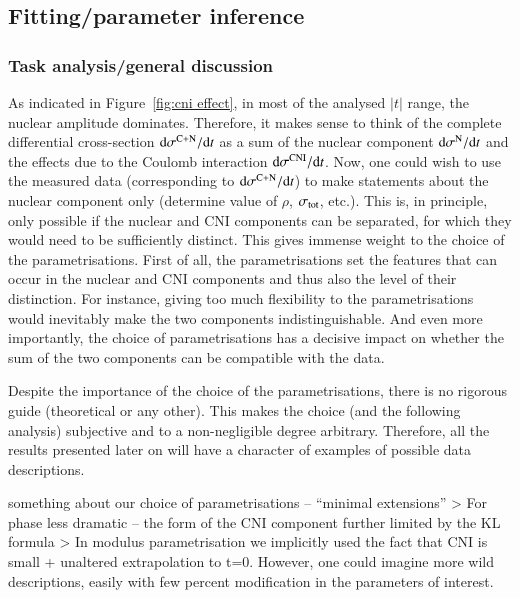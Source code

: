 \subsection{Fitting/parameter inference}
\label{sec:cni fitting}

\subsubsection{Task analysis/general discussion}

As indicated in Figure~\ref{fig:cni effect}, in most of the analysed $|t|$ range, the nuclear amplitude dominates. Therefore, it makes sense to think of the complete differential cross-section ${\rm d}\sigma^{\rm C+N} / {\rm d} t$ as a sum of the nuclear component ${\rm d}\sigma^{\rm N} / {\rm d} t$ and the effects due to the Coulomb interaction ${\rm d}\sigma^{\rm CNI} / {\rm d} t$. Now, one could wish to use the measured data (corresponding to ${\rm d}\sigma^{\rm C+N} / {\rm d} t$) to make statements about the nuclear component only (determine value of $\rho$, $\sigma_{\rm tot}$, etc.). This is, in principle, only possible if the nuclear and CNI components can be separated, for which they would need to be sufficiently distinct. This gives immense weight to the choice of the parametrisations. First of all, the parametrisations set the features that can occur in the nuclear and CNI components and thus also the level of their distinction. For instance, giving too much flexibility to the parametrisations would inevitably make the two components indistinguishable. And even more importantly, the choice of parametrisations has a decisive impact on whether the sum of the two components can be compatible with the data.

Despite the importance of the choice of the parametrisations, there is no rigorous guide (theoretical or any other). This makes the choice (and the following analysis) subjective and to a non-negligible degree arbitrary. Therefore, all the results presented later on will have a character of examples of possible data descriptions. 

\> something about our choice of parametrisations -- ``minimal extensions''
\>> For phase less dramatic -- the form of the CNI component further limited by the KL formula
\>> In modulus parametrisation we implicitly used the fact that CNI is small + unaltered extrapolation to t=0. However, one could imagine more wild descriptions, easily with few percent modification in the parameters of interest.

